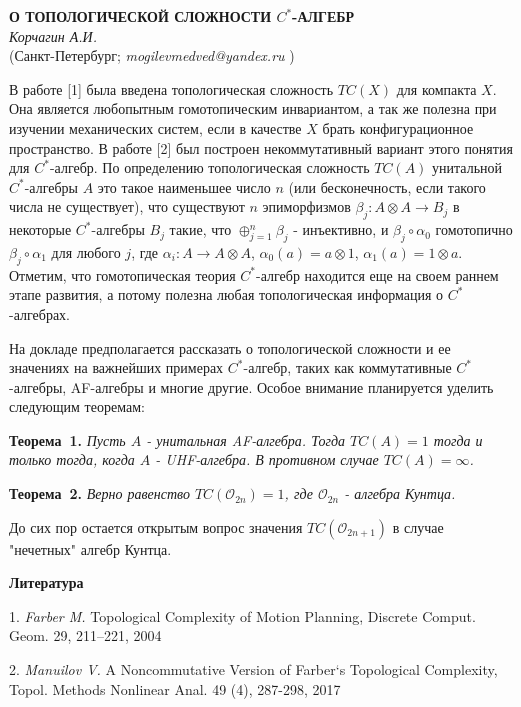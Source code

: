 \begin{center}{ \bf  О ТОПОЛОГИЧЕСКОЙ СЛОЖНОСТИ $C^*$-АЛГЕБР}\\
{\it Корчагин А.И. } \\
(Санкт-Петербург; {\it mogilevmedved@yandex.ru} )
\end{center}


В работе [1] была введена топологическая сложность $TC(X)$ для компакта $X$. Она является любопытным гомотопическим инвариантом, а так же полезна при изучении механических систем, если в качестве $X$ брать конфигурационное пространство. В работе [2] был построен некоммутативный вариант этого понятия для $C^*$-алгебр. По определению топологическая сложность $TC(A)$ унитальной $C^*$-алгебры $A$ это такое наименьшее число $n$ (или бесконечность, если такого числа не существует), что существуют $n$ эпиморфизмов $\beta_j:A\otimes A\to B_j$ в некоторые $C^*$-алгебры $B_j$ такие, что $\oplus_{j=1}^n\beta_j$ - инъективно, и $\beta_j\circ\alpha_0$ гомотопично $\beta_j\circ\alpha_1$ для любого $j$, где $\alpha_i:A\to A\otimes A$, $\alpha_0(a)=a\otimes1$, $\alpha_1(a)=1\otimes a$. Отметим, что гомотопическая теория $C^*$-алгебр находится еще на своем раннем этапе развития, а потому полезна любая топологическая информация о $C^*$-алгебрах.

На докладе предполагается рассказать о топологической сложности и ее значениях на важнейших примерах $C^*$-алгебр, таких как коммутативные $C^*$-алгебры, AF-алгебры и многие другие. Особое внимание планируется уделить следующим теоремам:

\textbf{Теорема~1.} {\it Пусть $A$ - унитальная AF-алгебра. Тогда $TC(A)=1$ тогда и только тогда, когда $A$ - UHF-алгебра. В противном случае $TC(A)=\infty$.}

\textbf{Теорема~2.} {\it Верно равенство $TC(\mathcal{O}_{2n})=1$, где $\mathcal{O}_{2n}$ - алгебра Кунтца.}

До сих пор остается открытым вопрос значения $TC(\mathcal{O}_{2n+1})$ в случае "нечетных" алгебр Кунтца.

\smallskip \centerline{\bf Литература}\nopagebreak

1. {\it Farber M.} Topological Complexity of Motion Planning, Discrete Comput. Geom. 29, 211–221, 2004

2. {\it Manuilov V.} A Noncommutative Version of Farber`s Topological Complexity, Topol. Methods Nonlinear
Anal. 49 (4), 287-298, 2017
